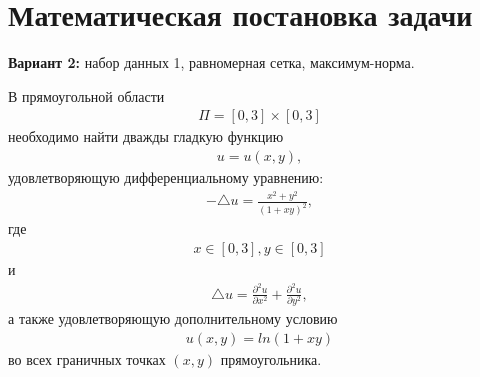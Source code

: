 \section{Математическая постановка задачи}

\textbf{Вариант 2:} набор данных 1, равномерная сетка, максимум-норма.

В прямоугольной области
\begin{gather}\Pi = [0, 3] \times [0, 3]\end{gather}
необходимо найти дважды гладкую функцию
\begin{gather}u = u(x, y),\end{gather}
удовлетворяющую дифференциальному уравнению:
\begin{gather}-\triangle u = \frac{x^2 + y^2}{(1 + xy)^2},\end{gather}
где
\begin{gather}x \in [0, 3], y \in [0, 3]\end{gather}
и
\begin{gather}\triangle u = \frac{\partial^2u}{\partial x^2} + \frac{\partial^2u}{\partial y^2},\end{gather}
а также удовлетворяющую дополнительному условию
\begin{gather}u(x, y) = ln(1 + xy)\end{gather}
во всех граничных точках $(x, y)$ прямоугольника.

\clearpage

